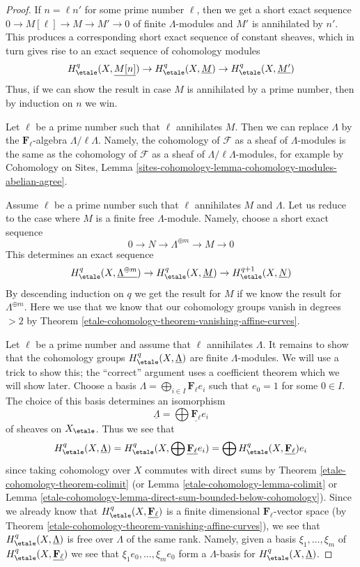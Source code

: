 \begin{proof}
If $n = \ell n'$ for some prime number $\ell$, then
we get a short exact sequence $0 \to M[\ell] \to M \to M' \to 0$
of finite $\Lambda$-modules and $M'$ is annihilated by $n'$.
This produces a corresponding short exact sequence of constant
sheaves, which in turn gives rise to an exact sequence
of cohomology modules
$$
H^q_\etale(X, \underline{M[n]}) \to
H^q_\etale(X, \underline{M}) \to
H^q_\etale(X, \underline{M'})
$$
Thus, if we can show the result in case $M$ is annihilated by
a prime number, then by induction on $n$ we win.

\medskip\noindent
Let $\ell$ be a prime number such that $\ell$ annihilates $M$.
Then we can replace $\Lambda$ by the $\mathbf{F}_\ell$-algebra
$\Lambda/\ell \Lambda$. Namely, the cohomology of $\mathcal{F}$
as a sheaf of $\Lambda$-modules is the same as the cohomology
of $\mathcal{F}$ as a sheaf of $\Lambda/\ell \Lambda$-modules,
for example by
Cohomology on Sites, Lemma
\ref{sites-cohomology-lemma-cohomology-modules-abelian-agree}.

\medskip\noindent
Assume $\ell$ be a prime number such that $\ell$ annihilates $M$
and $\Lambda$.
Let us reduce to the case where $M$ is a finite free $\Lambda$-module.
Namely, choose a short exact sequence
$$
0 \to N \to \Lambda^{\oplus m} \to M \to 0
$$
This determines an exact sequence
$$
H^q_\etale(X, \underline{\Lambda^{\oplus m}}) \to
H^q_\etale(X, \underline{M}) \to
H^{q + 1}_\etale(X, \underline{N})
$$
By descending induction on $q$ we get the result for $M$
if we know the result for $\Lambda^{\oplus m}$.
Here we use that we know that our cohomology groups
vanish in degrees $> 2$ by
Theorem \ref{etale-cohomology-theorem-vanishing-affine-curves}.

\medskip\noindent
Let $\ell$ be a prime number and assume that $\ell$ annihilates
$\Lambda$. It remains to show that the cohomology groups
$H^q_\etale(X, \underline{\Lambda})$ are finite $\Lambda$-modules.
We will use a trick to show this; the ``correct'' argument uses
a coefficient theorem which we will show later.
Choose a basis $\Lambda = \bigoplus_{i \in I} \mathbf{F}_\ell e_i$
such that $e_0 = 1$ for some $0 \in I$.
The choice of this basis determines an isomorphism
$$
\underline{\Lambda} = \bigoplus \underline{\mathbf{F}_\ell} e_i
$$
of sheaves on $X_\etale$. Thus we see that
$$
H^q_\etale(X, \underline{\Lambda}) =
H^q_\etale(X, \bigoplus \underline{\mathbf{F}_\ell} e_i) =
\bigoplus H^q_\etale(X, \underline{\mathbf{F}_\ell})e_i
$$
since taking cohomology over $X$ commutes with direct sums
by Theorem \ref{etale-cohomology-theorem-colimit}
(or Lemma \ref{etale-cohomology-lemma-colimit} or
Lemma \ref{etale-cohomology-lemma-direct-sum-bounded-below-cohomology}).
Since we already know that $H^q_\etale(X, \underline{\mathbf{F}_\ell})$
is a finite dimensional $\mathbf{F}_\ell$-vector space
(by Theorem \ref{etale-cohomology-theorem-vanishing-affine-curves}),
we see that $H^q_\etale(X, \underline{\Lambda})$
is free over $\Lambda$ of the same rank. Namely, given
a basis $\xi_1, \ldots, \xi_m$ of $H^q_\etale(X, \underline{\mathbf{F}_\ell})$
we see that $\xi_1 e_0, \ldots, \xi_m e_0$ form a $\Lambda$-basis for
$H^q_\etale(X, \underline{\Lambda})$.
\end{proof}

